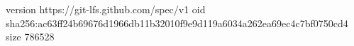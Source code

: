 version https://git-lfs.github.com/spec/v1
oid sha256:ac63ff24b69676d1966db11b32010f9e9d119a6034a262ea69ec4c7bf0750cd4
size 786528
